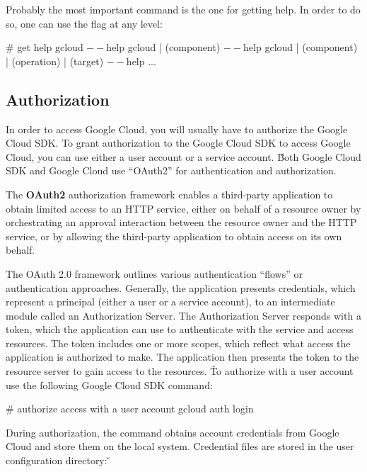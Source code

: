 Probably the most important command is the one for getting help. In order to do so, one can use the flag 
at any  level:

\begin{bash}
# get help
gcloud $--$help
gcloud | (component) $--$help
gcloud | (component) | (operation) | (target) $--$help
...
\end{bash}

\subsection{Authorization}

In order to access Google Cloud, you will usually have to authorize the Google Cloud SDK. To grant authorization to
the Google Cloud SDK to access Google Cloud, you can use either a user account or a service account. \v

Both Google Cloud SDK and Google Cloud use ``OAuth2'' for authentication and authorization.

\bd[OAuth2]
The \textbf{OAuth2} authorization framework enables a third-party application to obtain limited access to an HTTP service,
either on behalf of a resource owner by orchestrating an approval interaction between the resource owner and the HTTP
service, or by allowing the third-party application to obtain access on its own behalf.
\ed

The OAuth 2.0 framework outlines various authentication ``flows'' or authentication approaches. Generally, the
application presents credentials, which represent a principal (either a user or a service account), to an
intermediate module called an Authorization Server. The Authorization Server responds with a token, which the
application can use to authenticate with the service and access resources. The token includes one or more scopes,
which reflect what access the application is authorized to make. The application then presents the token to the
resource server to gain access to the resources. \v

To authorize with a user account use the following Google Cloud SDK command:
\begin{bash}
# authorize access with a user account
gcloud auth login
\end{bash}

During authorization, the command obtains account credentials from Google Cloud and store them on the local system.
Credential files are stored in the user configuration directory:  \v

